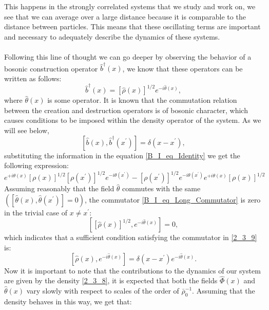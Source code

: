 This happens in the strongly correlated systems that we study and work on, we see that we can average over a large distance because it is comparable to the distance between particles. This means that these oscillating terms are important and necessary to adequately describe the dynamics of these systems. \\ \\
Following this line of thought we can go deeper by observing the behavior of a bosonic construction operator $\hat{b}^{\dagger}(x)$, we know that these operators can be written as follows:
\begin{equation}\label{B_I_eq_Identity}         
   \hat{b}^{\dagger} (x) = [\hat{\rho}(x)]^{1/2} e ^{-i\hat{\theta} (x)},
\end{equation}
where $\hat{\theta}(x)$ is some operator. It is known that the commutation relation between the creation and destruction operators is of bosonic character, which causes conditions to be imposed within the density operator of the system. As we will see below,
\begin{equation} \label{2_3_9}
    [\hat{b}(x), \hat{b}^{\dagger}(x^{\prime})] = \delta (x-x^{\prime}),
\end{equation}
substituting the information in the equation \ref{B_I_eq_Identity} we get the following expression:
\begin{equation}\label{B_I_eq_Long_Conmutator}
e^{+i \theta(x)}[\rho(x)]^{1 / 2}\left[\rho\left(x^{\prime}\right)\right]^{1 / 2} e^{-i \theta\left(x^{\prime}\right)}-\left[\rho\left(x^{\prime}\right)\right]^{1 / 2} e^{-i \theta\left(x^{\prime}\right)} e^{+i \theta(x)}[\rho(x)]^{1 / 2}
\end{equation}
Assuming reasonably that the field $\hat{\theta}$ commutes with the same $([\hat{\theta}(x),\hat{\theta}(x^{\prime})]=0)$, the commutator \ref{B_I_eq_Long_Commutator} is zero in the trivial case of $x\neq x^{\prime}$:
\begin{equation}  \label{2_3_10}
    [[\hat{\rho} (x)]^{1/2}, e^{-i \hat{\theta} (x)}]=0,
\end{equation}
which indicates that a sufficient condition satisfying the commutator in \eqref{2_3_9} is:
\begin{equation} \label{2_3_11}
    [\hat{\rho} (x), e ^{-i \hat{\theta} (x)}] = \delta (x-x^{\prime}) e^{-i \hat{\theta} (x)}.
\end{equation}
Now it is important to note that the contributions to the dynamics of our system are given by the density \eqref{2_3_8}, it is expected that both the fields $\hat{\Phi} (x)$ and $\hat{\theta} (x)$ vary slowly with respect to scales of the order of $\bar{\rho}_{0}^{-1}$. Assuming that the density behaves in this way, we get that:
